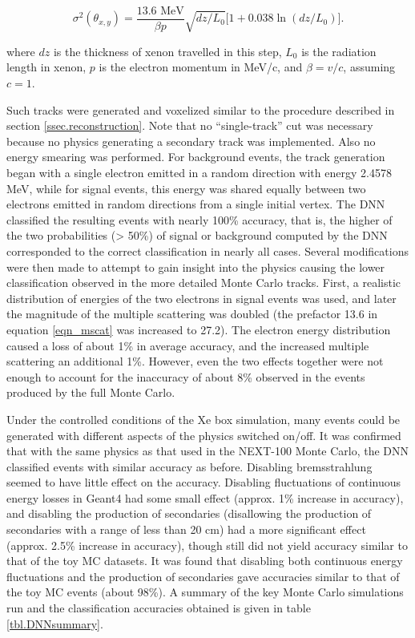 \documentclass[a4paper,11pt]{article}
\begin{document}
\begin{equation}\label{eqn_mscat}
\sigma^{2}(\theta_{x,y}) = \frac{13.6\,\,\mathrm{MeV}}{\beta p}\sqrt{dz/L_{0}}\bigl[1 + 0.038\ln(dz/L_{0})\bigr].
\end{equation}

\noindent where $dz$ is the thickness of xenon travelled in this step, $L_{0}$ is the radiation length in xenon, $p$ is the electron momentum in MeV/c, and $\beta = v/c$, assuming $c = 1$.

Such tracks were generated and voxelized similar to the procedure described in section \ref{ssec.reconstruction}.  Note that no ``single-track'' cut was necessary because no
physics generating a secondary track was implemented.  Also no energy smearing was performed.  For background events, the track generation began with a single electron emitted in a
random direction with energy 2.4578 MeV, while for signal events, this energy was shared equally between two electrons emitted in random directions from a single initial vertex.  The DNN
classified the resulting events with nearly 100\% accuracy, that is, the higher of the two probabilities (> 50\%) of signal or background computed by the DNN corresponded to the correct 
classification in nearly all cases.  Several modifications were then made to attempt to gain insight into the physics causing the lower classification observed in the
more detailed Monte Carlo tracks.  First, a realistic distribution of energies of the two electrons in signal events \cite{Ponkratenko_2000} was used, and later the magnitude of the multiple scattering was doubled (the prefactor 13.6 in equation \ref{eqn_mscat} was increased to 27.2).  The electron energy distribution caused a loss of about 1\% in average accuracy, and the
increased multiple scattering an additional 1\%.  However, even the two effects together were not enough to account for the inaccuracy of about 8\% observed in the events produced by the
full Monte Carlo.

Under the controlled conditions of the Xe box simulation, many events could be generated with different aspects of the physics switched on/off.  It was confirmed that with the same physics as 
that used in the NEXT-100 Monte Carlo, the DNN classified events 
with similar accuracy as before.  Disabling bremsstrahlung seemed to have little effect on the accuracy.  Disabling fluctuations of continuous energy losses in Geant4 had some small 
effect (approx. 1\% increase in accuracy), and disabling the production of secondaries (disallowing the production of secondaries with a range of less than 20 cm) had a more 
significant effect (approx. 2.5\% increase in accuracy), though still did not yield accuracy similar to that of the toy MC datasets.  It was found that disabling both continuous energy fluctuations 
and the production of secondaries gave accuracies similar to that of the toy MC events (about 98\%).  A summary of the key Monte Carlo simulations run and the classification accuracies 
obtained is given in table \ref{tbl.DNNsummary}.
\end{document}

